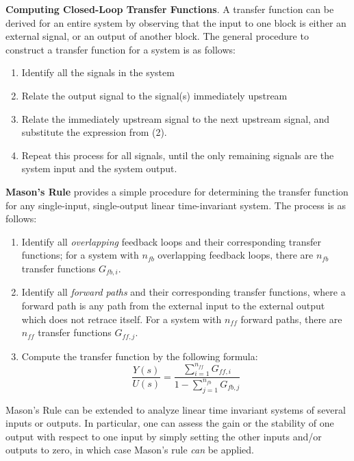 \begin{shaded}
    \textbf{Computing Closed-Loop Transfer Functions}. A transfer function can be derived for an entire system by observing that the input to one block is either an external signal, or an output of another block. The general procedure to construct a transfer function for a system is as follows: 
    \vspace{-1em}
    \begin{enumerate}
        \item Identify all the signals in the system
        \item Relate the output signal to the signal(s) immediately upstream
        \item Relate the immediately upstream signal to the next upstream signal, and substitute the expression from (2).
        \item Repeat this process for all signals, until the only remaining signals are the system input and the system output.
    \end{enumerate}

    \textbf{Mason's Rule} provides a simple procedure for determining the transfer function for any single-input, single-output linear time-invariant system. The process is as follows:
    \vspace{-1em}
    \begin{enumerate}
        \item Identify all \textit{overlapping} feedback loops and their corresponding transfer functions; for a system with $n_{fb}$ overlapping feedback loops, there are $n_{fb}$ transfer functions $G_{fb,i}$.
        \item Identify all \textit{forward paths} and their corresponding transfer functions, where a forward path is any path from the external input to the external output which does not retrace itself. For a system with $n_{ff}$ forward paths, there are $n_{ff}$ transfer functions $G_{ff,j}$.
        \item Compute the transfer function by the following formula: \[\frac{Y(s)}{U(s)} = \frac{\sum_{i=1}^{n_{ff}} G_{ff,i}}{1-\sum_{j=1}^{n_{fb}} G_{fb,j}}\]
    \end{enumerate}
    Mason's Rule can be extended to analyze linear time invariant systems of several inputs or outputs. In particular, one can assess the gain or the stability of one output with respect to one input by simply setting the other inputs and/or outputs to zero, in which case Mason's rule \textit{can} be applied.
\end{shaded}

